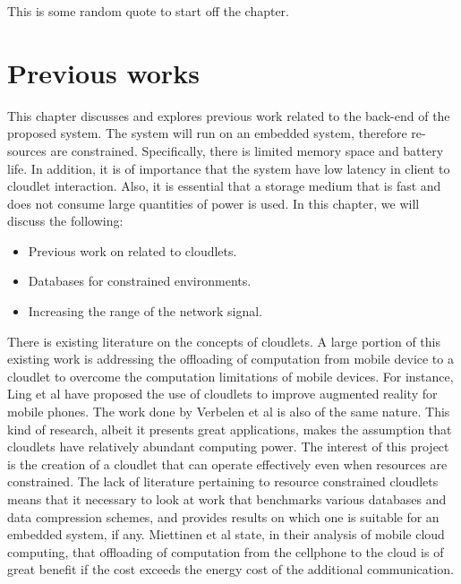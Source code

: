 \begin{savequote}[75mm] 
This is some random quote to start off the chapter.
\end{savequote}

\chapter{Previous works}
\label{chaptertwo}

This chapter discusses and explores previous work related to the back-end of
the proposed system. The system will run on an embedded system, therefore re-
sources are constrained. Specifically, there is limited memory space and battery
life. In addition, it is of importance that the system have low latency in client
to cloudlet interaction. Also, it is essential that a storage medium that is fast and does not consume large quantities of power is used. In this chapter, we
will discuss the following:

	\begin{itemize}
	\itemsep0em
	\item Previous work on related to cloudlets.
	\item Databases for constrained environments.
	\item Increasing the range of the network signal.
	\end{itemize}

There is existing literature on the concepts of cloudlets. A large portion of this existing work is addressing the offloading of computation from mobile device to a cloudlet to overcome the computation limitations of mobile devices. For instance, Ling et al\cite{ling2011ar} have proposed the use of cloudlets to improve augmented reality for mobile phones. The work done by Verbelen et al\cite{RefWorks:93} is also of the same nature. This kind of research, albeit it presents great applications, makes the assumption that cloudlets have relatively abundant computing power. The interest of this project is the creation of a cloudlet that can operate effectively even when resources are constrained. The lack of literature pertaining to resource constrained cloudlets means that it necessary to look at work that benchmarks various databases and data compression schemes, and provides results on which one is suitable for an embedded system, if any. Miettinen et al\cite{RefWorks:90} state, in their analysis of mobile cloud computing, that offloading of computation from the cellphone to the cloud is of great benefit if the cost exceeds the energy cost of the additional communication.

